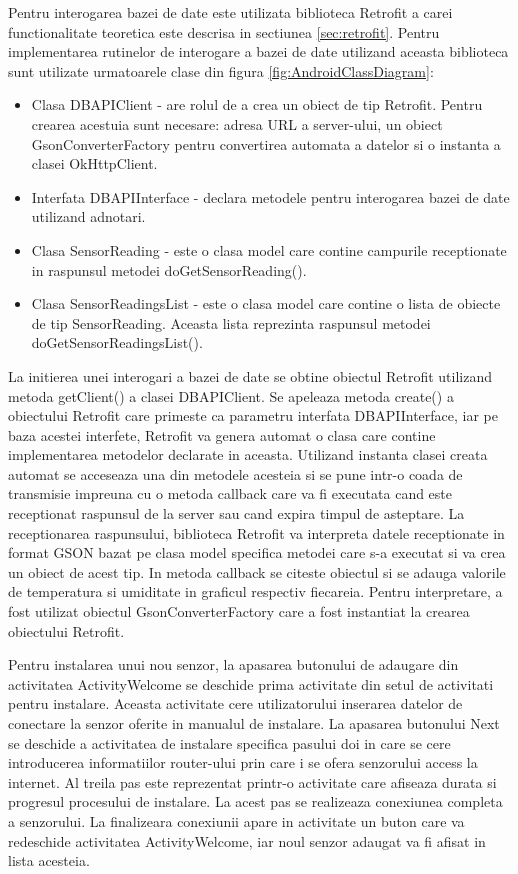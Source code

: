 Pentru interogarea bazei de date este utilizata biblioteca Retrofit a carei functionalitate teoretica este descrisa in sectiunea \ref{sec:retrofit}. Pentru implementarea 
rutinelor de interogare a bazei de date utilizand aceasta biblioteca sunt utilizate urmatoarele clase din figura \ref{fig:AndroidClassDiagram}:
\begin{itemize}
	\item Clasa DBAPIClient - are rolul de a crea un obiect de tip Retrofit. Pentru crearea acestuia sunt necesare: adresa URL a server-ului, un obiect GsonConverterFactory 
	pentru convertirea automata a datelor si o instanta a clasei OkHttpClient.
	\item Interfata DBAPIInterface - declara metodele pentru interogarea bazei de date utilizand adnotari.
	\item Clasa SensorReading - este o clasa model care contine campurile receptionate in raspunsul metodei doGetSensorReading().
	\item Clasa SensorReadingsList - este o clasa model care contine o lista de obiecte de tip SensorReading. Aceasta lista reprezinta raspunsul metodei doGetSensorReadingsList().
\end{itemize}

La initierea unei interogari a bazei de date se obtine obiectul Retrofit utilizand metoda getClient() a clasei DBAPIClient. Se apeleaza metoda create() a obiectului Retrofit care 
primeste ca parametru interfata DBAPIInterface, iar pe baza acestei interfete, Retrofit va genera automat o clasa care contine implementarea metodelor declarate in aceasta. 
Utilizand instanta clasei creata automat se acceseaza una din metodele acesteia si se pune intr-o coada de transmisie impreuna cu o metoda callback care va fi executata cand 
este receptionat raspunsul de la server sau cand expira timpul de asteptare. La receptionarea raspunsului, biblioteca Retrofit va interpreta datele receptionate in format GSON 
bazat pe clasa model specifica metodei care s-a executat si va crea un obiect de acest tip. In metoda callback se citeste obiectul si se adauga valorile de temperatura si 
umiditate in graficul respectiv fiecareia. Pentru interpretare, a fost utilizat obiectul GsonConverterFactory care a fost instantiat la crearea obiectului Retrofit.

Pentru instalarea unui nou senzor, la apasarea butonului de adaugare din activitatea ActivityWelcome se deschide prima activitate din setul de activitati pentru instalare. 
Aceasta activitate cere utilizatorului inserarea datelor de conectare la senzor oferite in manualul de instalare. La apasarea butonului Next se deschide a activitatea de 
instalare specifica pasului doi in care se cere introducerea informatiilor router-ului prin care i se ofera senzorului access la internet. Al treila pas este reprezentat 
printr-o activitate care afiseaza durata si progresul procesului de instalare. La acest pas se realizeaza conexiunea completa a senzorului. La finalizeara conexiunii apare 
in activitate un buton care va redeschide activitatea ActivityWelcome, iar noul senzor adaugat va fi afisat in lista acesteia. 

